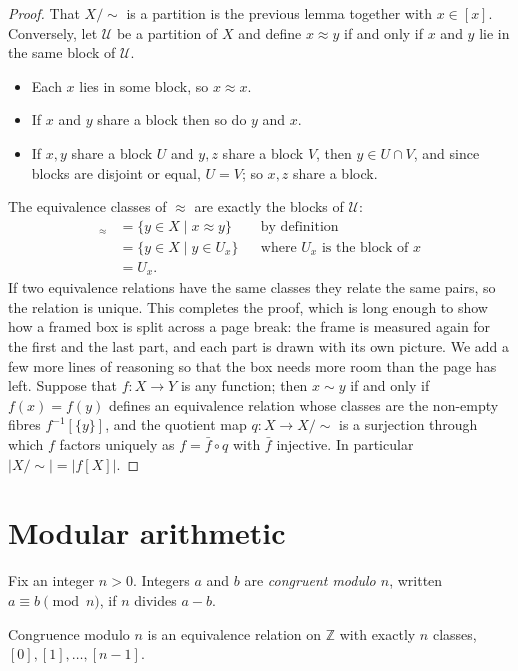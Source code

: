 \documentclass[10pt]{article}
\theoremstyle{break}
\begin{document}
\begin{proof}
That $X/{\sim}$ is a partition is the previous lemma together with $x \in [x]$.
Conversely, let $\mathcal{U}$ be a partition of $X$ and define $x \approx y$ if
and only if $x$ and $y$ lie in the same block of $\mathcal{U}$.
\begin{itemize}
\item Each $x$ lies in some block, so $x \approx x$.
\item If $x$ and $y$ share a block then so do $y$ and $x$.
\item If $x, y$ share a block $U$ and $y, z$ share a block $V$, then
$y \in U \cap V$, and since blocks are disjoint or equal, $U = V$; so $x, z$
share a block.
\end{itemize}
The equivalence classes of $\approx$ are exactly the blocks of $\mathcal{U}$:
\begin{align*}
[x]_{\approx} &= \{ y \in X \mid x \approx y \} && \text{by definition} \\
&= \{ y \in X \mid y \in U_x \} && \text{where $U_x$ is the block of $x$} \\
&= U_x .
\end{align*}
If two equivalence relations have the same classes they relate the same pairs,
so the relation is unique. This completes the proof, which is long enough to
show how a framed box is split across a page break: the frame is measured again
for the first and the last part, and each part is drawn with its own picture.
We add a few more lines of reasoning so that the box needs more room than the
page has left. Suppose that $f : X \to Y$ is any function; then $x \sim y$ if
and only if $f(x) = f(y)$ defines an equivalence relation whose classes are the
non-empty fibres $f^{-1}[\{y\}]$, and the quotient map $q : X \to X/{\sim}$ is a
surjection through which $f$ factors uniquely as $f = \bar{f} \circ q$ with
$\bar{f}$ injective. In particular $|X/{\sim}| = |f[X]|$.
\end{proof}

\section{Modular arithmetic}

\begin{definition}
Fix an integer $n > 0$. Integers $a$ and $b$ are \emph{congruent modulo $n$},
written $a \equiv b \pmod{n}$, if $n$ divides $a - b$.
\end{definition}

\begin{theorem}
Congruence modulo $n$ is an equivalence relation on $\mathbb{Z}$ with exactly
$n$ classes, $[0], [1], \dots, [n-1]$.
\end{theorem}
\end{document}
